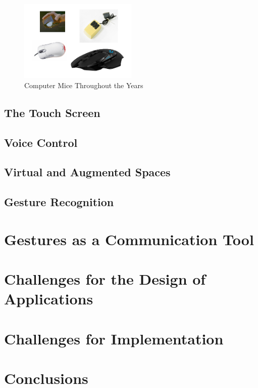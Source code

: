 \documentclass{article}
\begin{document}
\begin{figure}[!ht]
    \caption{Computer Mice Throughout the Years}
    \label{image:mice}
    \centering
    \includegraphics[width=0.5\textwidth]{pics/mice.png}
\end{figure}

\newpage
\subsection{The Touch Screen}

\subsection{Voice Control}

\subsection{Virtual and Augmented Spaces}

\subsection{Gesture Recognition}

\section{Gestures as a Communication Tool}

\section{Challenges for the Design of Applications}

\section{Challenges for Implementation}

\section{Conclusions}
\end{document}
